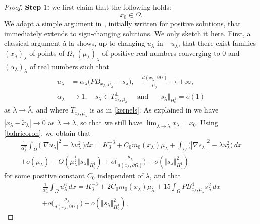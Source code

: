 \documentclass[10pt]{amsart}
\numberwithin{equation}{section}
\newcommand{\Om}{\Omega}
\theoremstyle{plain}
\theoremstyle{remark}
\begin{document}
\begin{proof}
 \textbf{Step $1$:} we first claim that the following holds:
\begin{equation} \label{x0:interieur}
x_0 \in \Om. 
\end{equation}
We adapt a simple argument in \cite[Proposition 4.1]{FrankKonigKovarik3autre}, initially written for positive solutions, that immediately extends to sign-changing solutions. We only sketch it here. First, a classical argument \`a la \cite[Proposition 7]{BahriCoron} shows, up to changing $u_\lambda$ in $-u_\lambda$, that  there exist families $(x_\lambda)_{\lambda}$ of points of $\Om$, $(\mu_\lambda)_{\lambda}$ of positive real numbers converging to $0$ and $(\alpha_\lambda)_{\lambda}$ of real numbers such that 
 \begin{equation} \label{bahricoron}
  \begin{aligned} 
 u_\lambda & = \alpha_\lambda \big( P B_{x_\lambda, \mu_\lambda} + s_\lambda \big) ,\quad \frac{d(x_\lambda, \partial \Om)}{\mu_\lambda}  \to + \infty, \\
\alpha _\lambda & \to 1, \quad s_\lambda  \in T_{x_\lambda, \mu_\lambda}^{\perp} \quad \text{ and } \quad  \Vert s_\lambda \Vert_{H_0^1} = o(1)
 \end{aligned} 
\end{equation}
as $\lambda \to \bar{\lambda}$, and where $T_{x_\lambda, \mu_\lambda}$ is as in \eqref{kernels}. As explained in \cite[Proposition 7]{BahriCoron} we have $|x_\lambda - \tilde{x}_\lambda| \to 0$ as $\lambda \to \bar{\lambda}$, so that we still have $\lim_{\lambda \to \bar{\lambda}} x_\lambda = x_0$. Using \eqref{bahricoron}, we obtain that 
$$ \begin{aligned} 
 \frac{1}{\alpha_\lambda^2} \int_{\Om}\big( |\nabla u_\lambda|^2 - \lambda u_\lambda^2 \, \big) dx =  K_3^{-3} + C_0 m_0(x_\lambda) \mu_\lambda +  \int_{\Om}\big( |\nabla s_\lambda|^2 - \lambda u_\lambda^2 \big)\, dx \\
 +  o(\mu_\lambda) + O (\mu_\lambda^{\frac12} \Vert s_\lambda \Vert_{H^1_0}) + o \Big( \frac{\mu_\lambda}{d(x_\lambda, \partial \Om)} \Big)+ o(\Vert s_\lambda \Vert_{H^1_0}^2 )
\end{aligned} $$ 
for some positive constant $C_0$ independent of $\lambda$, and that 
$$  \begin{aligned} 
 \frac{1}{\alpha_\lambda^6}  \int_{\Om} u_\lambda^6 \, dx =   K_3^{-3} + 2 C_0 m_0(x_\lambda) \mu_\lambda + 15 \int_{\Om} PB_{x_\lambda, \mu_\lambda}^4 s_\lambda^2 \, dx \\
 + o \Big( \frac{\mu_\lambda}{d(x_\lambda, \partial \Om)} \Big)+ o(\Vert s_\lambda \Vert_{H^1_0}^2 ),

\end{aligned}$$
\end{proof}
\end{document}
